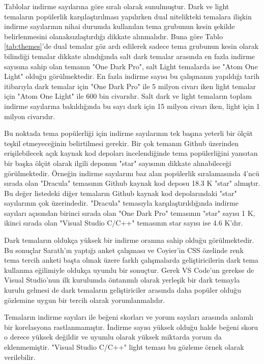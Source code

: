 \documentclass{article}
\begin{document}
Tablolar indirme sayılarına göre sıralı olarak sunulmuştur.  Dark ve light temaların popülerlik karşılaştırılması
yapılırken dual nitelikteki temalara ilişkin indirme sayılarının nihai durumda kullanılan tema grubunun kesin şekilde
belirlenmesini olanaksızlaştırdığı dikkate alınmalıdır.  Buna göre Tablo \ref{tab:themes}'de dual temalar göz ardı
edilerek sadece tema grubunun kesin olarak bilindiği temalar dikkate alındığında salt dark temalar arasında en fazla indirme
sayısına sahip olan temanın "One Dark Pro", salt Light temalarda ise "Atom One Light" olduğu görülmektedir. En fazla indirme sayısı bu
çalışmanın yapıldığı tarih itibarıyla dark temalar için "One Dark Pro" ile 5 milyon civarı iken light temalar için "Atom
One Light" ile 600 bin civarıdır. Salt dark ve light temaların toplam indirme sayılarına bakıldığında bu sayı dark için 15 milyon
civarı iken, light için 1 milyon civarıdır.

Bu noktada tema popülerliği için indirme sayılarının tek başına yeterli bir ölçüt teşkil etmeyeceğinin belirtilmesi
gerekir.  Bir çok temanın Github üzerinden erişilebilecek açık kaynak kod depoları incelendiğinde tema popülerliğini
yansıtan bir başka ölçüt olarak ilgili deponun "star" sayısının dikkate alınabileceği görülmektedir. Örneğin indirme
sayılarını baz alan popülerlik sıralamasında 4'ncü sırada olan "Dracula" temasının Github kaynak kod deposu 18.3 K
"star" almıştır\cite{draculatheme2022github}. Bu değer listedeki diğer temaların Github kaynak kod depolarındaki "star"
sayılarının çok üzerindedir.  "Dracula" temasıyla karşılaştırıldığında indirme sayıları açısından birinci sırada olan
"One Dark Pro" temasının "star" sayısı 1 K\cite{onedarkprotheme2022github}, ikinci sırada olan "Visual Studio C/C++"
temasının star sayısı ise 4.6 K'dır\cite{visualstudiotheme2022github}.

Dark temaların oldukça yüksek bir indirme oranına sahip olduğu görülmektedir. Bu sonuçlar Sarath'ın yaptığı anket
çalışması \cite{sarath2016prefer} ve Coyier'in CSS özelinde renk tema tercih anketi \cite{coyier2013poll} başta olmak
üzere farklı çalışmalarda geliştiricilerin dark tema kullanma eğilimiyle oldukça uyumlu bir sonuçtur.  Gerek VS Code'un
gerekse de Visual Studio'nun ilk kurulumda öntanımlı olarak yerleşik bir dark temayla kurulu gelmesi de dark temaların
geliştiriciler arasında daha popüler olduğu gözlemine uygun bir tercih olarak yorumlanmalıdır.

Temaların indirme sayıları ile beğeni skorları ve yorum sayıları arasında anlamlı bir korelasyona rastlanmamıştır.
İndirme sayısı yüksek olduğu halde beğeni skoru o derece yüksek değildir ve uyumlu olarak yüksek miktarda yorum da
eklenmemiştir. "Visual Studio C/C++" light teması bu gözleme örnek olarak verilebilir.
\end{document}
